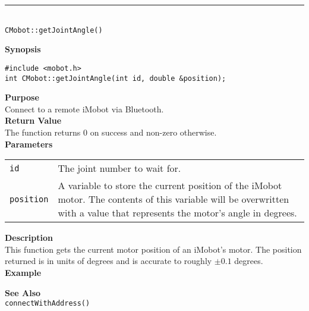 \noindent
\vspace{5pt}
\rule{4.5in}{0.015in}\\
\noindent
{\LARGE \texttt{CMobot::getJointAngle()}}\\
{}

\noindent
{\bf Synopsis}\\
\begin{verbatim}
#include <mobot.h>
int CMobot::getJointAngle(int id, double &position);
\end{verbatim}

\noindent
{\bf Purpose}\\
Connect to a remote iMobot via Bluetooth.\\

\noindent
{\bf Return Value}\\
The function returns 0 on success and non-zero otherwise.\\

\noindent
{\bf Parameters}\\
\vspace{-0.1in}
\begin{description}
\item               
\begin{tabular}{p{10 mm}p{145 mm}}
\texttt{id} & The joint number to wait for. \\
\texttt{position} & A variable to store the current position of the iMobot
motor. The contents of this variable will be overwritten with a value that
represents the motor's angle in degrees.  \\
\end{tabular}
\end{description}

\noindent
{\bf Description}\\
This function gets the current motor position of an iMobot's motor. The
position returned is in units of degrees and is accurate to roughly $\pm0.1$
degrees. \\

\noindent
{\bf Example}\\
\noindent

\noindent
{\bf See Also}\\
\texttt{connectWithAddress()}

